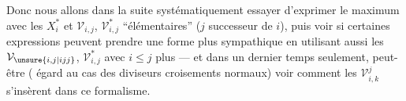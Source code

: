 Donc nous allons dans la suite systématiquement essayer d'exprimer le maximum avec les $X_i^*$ et  $\mathcal{V}_{i,j}$, $\mathcal{V}_{i,j}^*$ ``élémentaires'' ($j$ successeur de $i$), puis voir si certaines expressions peuvent prendre une forme plus sympathique en utilisant aussi  les $\mathcal{V}_{\unsure{i,j|ijj}}$, $\mathcal{V}_{i,j}^*$ avec $i\leq j$  plus — et dans un dernier temps seulement, peut-être ( égard au cas des diviseurs  croisements normaux) voir comment les $\mathcal{V}_{i,k}^j$ s'insèrent dans ce formalisme.
